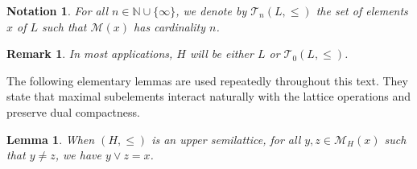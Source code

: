 \documentclass{article}
\newtheorem{lemma}[theorem]{Lemma}
\newtheorem{definition}[theorem]{Definition}
\newtheorem{notation}[theorem]{Notation}
\newtheorem{remark}[theorem]{Remark}
\begin{document}
\begin{notation}
For all $n \in \mathbb N \cup \{\infty\}$, we denote by $\mathcal{T}_n(L,\le)$ the set of elements $x$ of $L$ such that $\mathcal{M}(x)$ has cardinality $n$. 
\end{notation}

\begin{remark}In most applications, \(H\) will be either \(L\) or \(\mathcal{T}_0(L,\leq)\). \end{remark}

The following elementary lemmas are used repeatedly throughout this text.
They state that maximal subelements interact naturally with the lattice operations and preserve dual compactness.





\begin{lemma}\label{lemma.cover.max}
    When $(H,\le)$ is an upper semilattice, for all $y, z \in \mathcal{M}_H(x)$ such that $y \neq z$, we have $y \vee z = x$. 
\end{lemma}
\end{document}
